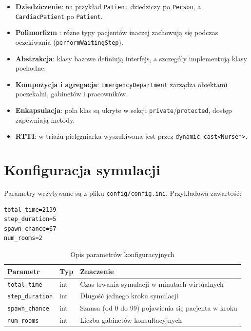 \documentclass[12pt,a4paper]{article}
\begin{document}
\begin{itemize}
	\item \textbf{Dziedziczenie}: na przykład \texttt{Patient} dziedziczy po
	      \texttt{Person}, a \texttt{CardiacPatient} po \texttt{Patient}.
	\item \textbf{Polimorfizm }: różne typy pacjentów inaczej
	      zachowują się podczas oczekiwania (\texttt{performWaitingStep}).
	\item \textbf{Abstrakcja}: klasy bazowe definiują interfejs, a szczegóły
	      implementują klasy pochodne.
	\item \textbf{Kompozycja i agregacja}: \texttt{EmergencyDepartment}
	      zarządza obiektami poczekalni, gabinetów i pracowników.
	\item \textbf{Enkapsulacja}: pola klas są ukryte w sekcji
	      \texttt{private}/\texttt{protected}, dostęp zapewniają metody.
	\item \textbf{RTTI}: w triażu pielęgniarka wyszukiwana jest przez
	      \texttt{dynamic\_cast\textless Nurse*\textgreater}.
\end{itemize}

\section{Konfiguracja symulacji}

Parametry wczytywane są z pliku \texttt{config/config.ini}. Przykładowa zawartość:

\begin{lstlisting}
total_time=2139
step_duration=5
spawn_chance=67
num_rooms=2
\end{lstlisting}

\begin{table}[H]
	\centering
	\caption{Opis parametrów konfiguracyjnych}
	\begin{tabular}{@{}llp{7cm}@{}}
		\toprule
		Parametr                & Typ & Znaczenie                                           \\
		\midrule
		\texttt{total\_time}    & int & Czas trwania symulacji w minutach wirtualnych       \\
		\texttt{step\_duration} & int & Długość jednego kroku symulacji                     \\
		\texttt{spawn\_chance}  & int & Szansa (od 0 do 99) pojawienia się pacjenta w kroku \\
		\texttt{num\_rooms}     & int & Liczba gabinetów konsultacyjnych                    \\
		\bottomrule
	\end{tabular}
\end{table}
\end{document}
